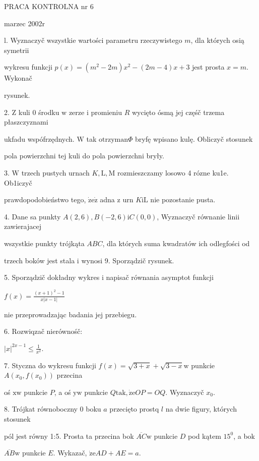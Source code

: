\documentclass[a4paper,12pt]{article}
\begin{document}
PRACA KONTROLNA nr 6

marzec 2002r

l. Wyznaczyč wszystkie wartości parametru rzeczywistego $m$, dla których osią symetrii

wykresu funkcji $p(x)=(m^{2}-2m)x^{2}-(2m-4)x+3$ jest prosta $x=m$. Wykonač

rysunek.

2. $\mathrm{Z}$ kuli $0$ środku $\mathrm{w}$ zerze $\mathrm{i}$ promieniu $R$ wycięto ósmą jej częśč trzema płaszczyznami

ukfadu wspófrzędnych. $\mathrm{W}$ tak $\mathrm{o}\mathrm{t}\mathrm{r}\mathrm{z}\mathrm{y}\mathrm{m}\mathrm{a}\mathrm{n}\Phi$ bryfę wpisano kulę. Obliczyč stosunek

pola powierzchni tej kuli do pola powierzchni bryły.

3. $\mathrm{W}$ trzech pustych urnach $K, \mathrm{L}, \mathrm{M}$ rozmieszczamy losowo 4 rózne ku1e. Ob1iczyč

prawdopodobieństwo tego, $\dot{\mathrm{z}}\mathrm{e}\dot{\mathrm{z}}$ adna $\mathrm{z}$ urn $K\mathrm{i}\mathrm{L}$ nie pozostanie pusta.

4. Dane sa punkty $A(2,6), B(-2,6)\mathrm{i}C(0,0)$, Wyznaczyč równanie linii zawierajacej

wszystkie punkty trójkąta $ABC$, dla których suma kwadratów ich odlegfości od

trzech boków jest stala $\mathrm{i}$ wynosi 9. Sporządzič rysunek.

5. Sporządzič dokładny wykres $\mathrm{i}$ napisač równania asymptot funkcji

$f(x)=\displaystyle \frac{(x+1)^{2}-1}{x|x-1|}$

nie przeprowadzając badania jej przebiegu.

6. Rozwiqzač nierównośč:

$|x|^{2x-1}\displaystyle \leq\frac{1}{x^{2}}.$

7. Styczna do wykresu funkcji $f(x)=\sqrt{3+x}+\sqrt{3-x}\mathrm{w}$ punkcie $A(x_{0},f(x_{0}))$ przecina

oś $\mathrm{x}\mathrm{w}$ punkcie $P$, a oś $\mathrm{y}\mathrm{w}$ punkcie $Q\mathrm{t}\mathrm{a}\mathrm{k}, \dot{\mathrm{z}}\mathrm{e}OP=OQ$. Wyznaczyč $x_{0}.$

8. Trójkat równoboczny $0$ boku $a$ przecięto prostq $l$ na dwie figury, których stosunek

pól jest równy 1:5. Prosta ta przecina bok $\overline{AC}\mathrm{w}$ punkcie $D$ pod kątem $15^{0}$, a bok

$\overline{AB}\mathrm{w}$ punkcie $E$. Wykazač, $\dot{\mathrm{z}}\mathrm{e}AD+AE=a.$
\end{document}
